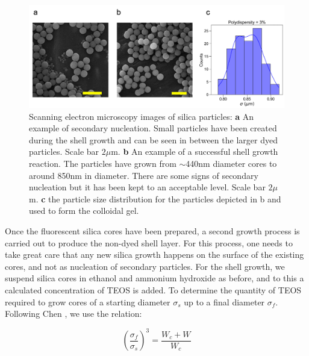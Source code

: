 \begin{figure}
	\centering
	\includegraphics[width=\linewidth]{figsExpMethods/figParticleSize}
	\caption[Synthesis of silica nanoparticles]{Scanning electron microscopy images of silica particles: \textbf{a} An example of secondary nucleation. Small particles have been created during the shell growth and can be seen in between the larger dyed particles. Scale bar $2\mu$m. \textbf{b} An example of a successful shell growth reaction. The particles have grown from $\sim$440nm diameter cores to around 850nm in diameter. There are some signs of secondary nucleation but it has been kept to an acceptable level. Scale bar $2\mu$m. \textbf{c} the particle size distribution for the particles depicted in b and used to form the colloidal gel.}
	\label{fig:sem}
\end{figure}


Once the fluorescent silica cores have been prepared, a second growth process is carried out to produce the non-dyed shell layer. For this process, one needs to take great care that any new silica growth happens on the surface of the existing cores, and not as nucleation of secondary particles. 
For the shell growth, we suspend silica cores in ethanol and ammonium hydroxide as before, and to this a calculated concentration of TEOS is added. To determine the quantity of TEOS required to grow cores of a starting diameter $\sigma_{s}$ up to a final diameter $\sigma_{f}$. Following Chen \etal \cite{chen1996}, we use the relation:

\begin{equation}
	\left( \frac{\sigma_{f}}{\sigma_{s}}\right)^{3} = \frac{W_{c} + W}{W_{c}}
\end{equation}


